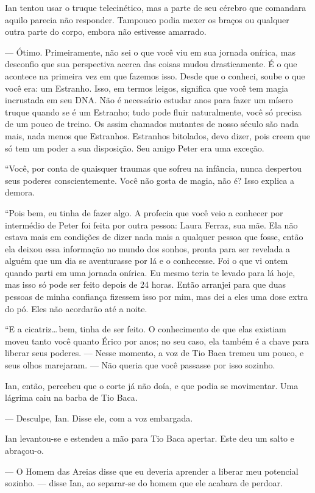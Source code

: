 Ian tentou usar o truque telecinético, mas a parte de seu cérebro que
comandara aquilo parecia não responder. Tampouco podia mexer os braços
ou qualquer outra parte do corpo, embora não estivesse amarrado.

--- Ótimo. Primeiramente, não sei o que você viu em sua jornada onírica,
mas desconfio que sua perspectiva acerca das coisas mudou drasticamente.
É o que acontece na primeira vez em que fazemos isso. Desde que o
conheci, soube o que você era: um Estranho. Isso, em termos leigos,
significa que você tem magia incrustada em seu DNA. Não é necessário
estudar anos para fazer um mísero truque quando se é um Estranho; tudo
pode fluir naturalmente, você só precisa de um pouco de treino. Os assim
chamados mutantes de nosso século são nada mais, nada menos que
Estranhos. Estranhos bitolados, devo dizer, pois creem que só tem um
poder a sua disposição. Seu amigo Peter era uma exceção.

“Você, por conta de quaisquer traumas que sofreu na infância, nunca
despertou seus poderes conscientemente. Você não gosta de magia, não é?
Isso explica a demora.

“Pois bem, eu tinha de fazer algo. A profecia que você veio a conhecer
por intermédio de Peter foi feita por outra pessoa: Laura Ferraz, sua
mãe. Ela não estava mais em condições de dizer nada mais a qualquer
pessoa que fosse, então ela deixou essa informação no mundo dos sonhos,
pronta para ser revelada a alguém que um dia se aventurasse por lá e o
conhecesse. Foi o que vi ontem quando parti em uma jornada onírica. Eu
mesmo teria te levado para lá hoje, mas isso só pode ser feito depois de
24 horas. Então arranjei para que duas pessoas de minha confiança
fizessem isso por mim, mas dei a eles uma dose extra do pó. Eles não
acordarão até a noite.

“E a cicatriz\ldots\,bem, tinha de ser feito. O conhecimento de que elas
existiam moveu tanto você quanto Érico por anos; no seu caso, ela também
é a chave para liberar seus poderes. --- Nesse momento, a voz de Tio
Baca tremeu um pouco, e seus olhos marejaram. --- Não queria que você
passasse por isso sozinho.

Ian, então, percebeu que o corte já não doía, e que podia se movimentar.
Uma lágrima caiu na barba de Tio Baca.

--- Desculpe, Ian. Disse ele, com a voz embargada.

Ian levantou-se e estendeu a mão para Tio Baca apertar. Este deu um
salto e abraçou-o.

--- O Homem das Areias disse que eu deveria aprender a liberar meu
potencial sozinho. --- disse Ian, ao separar-se do homem que ele acabara
de perdoar.


